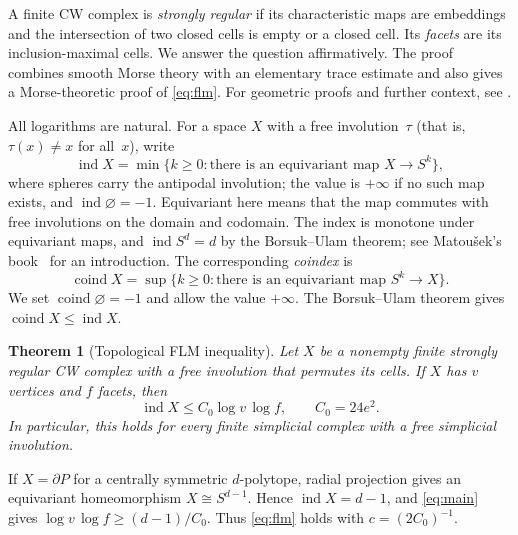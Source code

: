 \documentclass[11pt]{article}
\newtheorem{theorem}{Theorem}
\theoremstyle{remark}
\DeclareMathOperator{\ind}{ind}
\DeclareMathOperator{\coind}{coind}
\newcommand{\Czero}{C_0}
\begin{document}
A finite CW complex is \emph{strongly regular} if its characteristic
maps are embeddings and the intersection of two closed cells is
empty or a closed cell. Its \emph{facets} are its inclusion-maximal
cells. We answer the question affirmatively. The proof combines
smooth Morse theory with an elementary trace estimate and also
gives a Morse-theoretic proof of \eqref{eq:flm}. For geometric
proofs and further context, see \cite{FLM,Milo}.

All logarithms are natural. For a space $X$ with a free involution~$\tau$ (that is, $\tau(x)\ne x$ for all~$x$), 
write
\[
 \ind X=\min\{k\geq0:\text{there is an equivariant map }X\longrightarrow S^k\},
\]
where spheres carry the antipodal involution; the value is $+\infty$
if no such map exists, and $\ind\varnothing=-1$. Equivariant here means that the map commutes with free involutions on the domain and codomain.
The index is monotone under equivariant maps, and $\ind S^d=d$ by the
Borsuk--Ulam theorem; see Matou\v sek's book~\cite{Matousek} for an introduction.
The corresponding \emph{coindex} is
\[
 \coind X=\sup\{k\geq0:\text{there is an equivariant map }
 S^k\longrightarrow X\}.
\]
We set $\coind\varnothing=-1$ and allow the value $+\infty$.
The Borsuk--Ulam theorem gives $\coind X\leq\ind X$.

\begin{theorem}[Topological FLM inequality]\label{thm:main}
Let $X$ be a nonempty finite strongly regular CW complex with a free
involution that permutes its cells. If $X$ has $v$ vertices and $f$
facets, then
\begin{equation}\label{eq:main}
 \ind X\leq \Czero\log v\,\log f,
 \qquad \Czero=24e^2.
\end{equation}
In particular, this holds for every finite simplicial complex with a
free simplicial involution.
\end{theorem}

If $X=\partial P$ for a centrally symmetric
$d$-polytope, radial projection gives an equivariant homeomorphism
$X\cong S^{d-1}$. Hence $\ind X=d-1$, and \eqref{eq:main} gives
$\log v\,\log f\geq(d-1)/C_0$.
Thus \eqref{eq:flm} holds with $c=(2C_0)^{-1}$.
\end{document}
